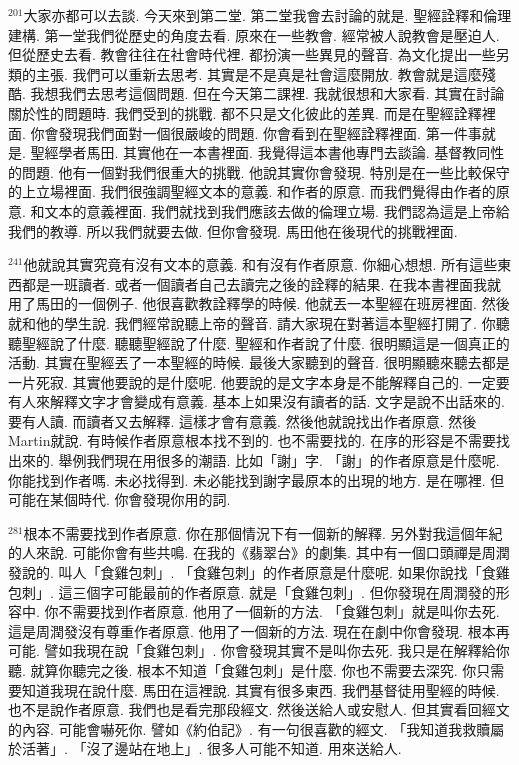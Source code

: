 \documentclass{book}
\begin{document}
$^{201}$大家亦都可以去談.
今天來到第二堂.
第二堂我會去討論的就是.
聖經詮釋和倫理建構.
第一堂我們從歷史的角度去看.
原來在一些教會.
經常被人說教會是壓迫人.
但從歷史去看.
教會往往在社會時代裡.
都扮演一些異見的聲音.
為文化提出一些另類的主張.
我們可以重新去思考.
其實是不是真是社會這麼開放.
教會就是這麼殘酷.
我想我們去思考這個問題.
但在今天第二課裡.
我就很想和大家看.
其實在討論關於性的問題時.
我們受到的挑戰.
都不只是文化彼此的差異.
而是在聖經詮釋裡面.
你會發現我們面對一個很嚴峻的問題.
你會看到在聖經詮釋裡面.
第一件事就是.
聖經學者馬田.
其實他在一本書裡面.
我覺得這本書他專門去談論.
基督教同性的問題.
他有一個對我們很重大的挑戰.
他說其實你會發現.
特別是在一些比較保守的上立場裡面.
我們很強調聖經文本的意義.
和作者的原意.
而我們覺得由作者的原意.
和文本的意義裡面.
我們就找到我們應該去做的倫理立場.
我們認為這是上帝給我們的教導.
所以我們就要去做.
但你會發現.
馬田他在後現代的挑戰裡面.

$^{241}$他就說其實究竟有沒有文本的意義.
和有沒有作者原意.
你細心想想.
所有這些東西都是一班讀者.
或者一個讀者自己去讀完之後的詮釋的結果.
在我本書裡面我就用了馬田的一個例子.
他很喜歡教詮釋學的時候.
他就丟一本聖經在班房裡面.
然後就和他的學生說.
我們經常說聽上帝的聲音.
請大家現在對著這本聖經打開了.
你聽聽聖經說了什麼.
聽聽聖經說了什麼.
聖經和作者說了什麼.
很明顯這是一個真正的活動.
其實在聖經丟了一本聖經的時候.
最後大家聽到的聲音.
很明顯聽來聽去都是一片死寂.
其實他要說的是什麼呢.
他要說的是文字本身是不能解釋自己的.
一定要有人來解釋文字才會變成有意義.
基本上如果沒有讀者的話.
文字是說不出話來的.
要有人讀.
而讀者又去解釋.
這樣才會有意義.
然後他就說找出作者原意.
然後Martin就說.
有時候作者原意根本找不到的.
也不需要找的.
在序的形容是不需要找出來的.
舉例我們現在用很多的潮語.
比如「謝」字.
「謝」的作者原意是什麼呢.
你能找到作者嗎.
未必找得到.
未必能找到謝字最原本的出現的地方.
是在哪裡.
但可能在某個時代.
你會發現你用的詞.

$^{281}$根本不需要找到作者原意.
你在那個情況下有一個新的解釋.
另外對我這個年紀的人來說.
可能你會有些共鳴.
在我的《翡翠台》的劇集.
其中有一個口頭禪是周潤發說的.
叫人「食雞包刺」.
「食雞包刺」的作者原意是什麼呢.
如果你說找「食雞包刺」.
這三個字可能最前的作者原意.
就是「食雞包刺」.
但你發現在周潤發的形容中.
你不需要找到作者原意.
他用了一個新的方法.
「食雞包刺」就是叫你去死.
這是周潤發沒有尊重作者原意.
他用了一個新的方法.
現在在劇中你會發現.
根本再可能.
譬如我現在說「食雞包刺」.
你會發現其實不是叫你去死.
我只是在解釋給你聽.
就算你聽完之後.
根本不知道「食雞包刺」是什麼.
你也不需要去深究.
你只需要知道我現在說什麼.
馬田在這裡說.
其實有很多東西.
我們基督徒用聖經的時候.
也不是說作者原意.
我們也是看完那段經文.
然後送給人或安慰人.
但其實看回經文的內容.
可能會嚇死你.
譬如《約伯記》.
有一句很喜歡的經文.
「我知道我救贖屬於活著」.
「沒了邊站在地上」.
很多人可能不知道.
用來送給人.
\end{document}
